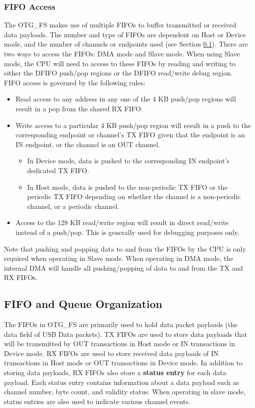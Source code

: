 \documentclass[main\_\_EN.tex]{subfiles}
\begin{document}
\subsubsection{FIFO Access}

The OTG\_FS makes use of multiple FIFOs to buffer transmitted or received data payloads. The number and type of FIFOs are dependent on Host or Device mode, and the number of channels or endpoints used (see Section \ref{FIFO and Queue Organization}). There are two ways to access the FIFOs: DMA mode and Slave mode. When using Slave mode, the CPU will need to access to these FIFOs by reading and writing to either the DFIFO push/pop regions or the DFIFO read/write debug region. FIFO access is governed by the following rules:

\begin{itemize}
    \item Read access to any address in any one of the 4 KB push/pop regions will result in a pop from the shared RX FIFO.
    \item Write access to a particular 4 KB push/pop region will result in a push to the corresponding endpoint or channel’s TX FIFO given that the endpoint is an IN endpoint, or the channel is an OUT channel.
    \begin{itemize}
        \item In Device mode, data is pushed to the corresponding IN endpoint’s dedicated TX FIFO.
        \item In Host mode, data is pushed to the non-periodic TX FIFO or the periodic TX FIFO depending on whether the channel is a non-periodic channel, or a periodic channel.
    \end{itemize}
    \item Access to the 128 KB read/write region will result in direct read/write instead of a push/pop. This is generally used for debugging purposes only.
\end{itemize}

Note that pushing and popping data to and from the FIFOs by the CPU is only required when operating in Slave mode. When operating in DMA mode, the internal DMA will handle all pushing/popping of data to and from the TX and RX FIFOs.

\subsection{FIFO and Queue Organization}\label{FIFO and Queue Organization}
The FIFOs in OTG\_FS are primarily used to hold data packet payloads (the data field of USB Data packets). TX FIFOs are used to store data payloads that will be transmitted by OUT transactions in Host mode or IN transactions in Device mode. RX FIFOs are used to store received data payloads of IN transactions in Host mode or OUT transactions in Device mode. In addition to storing data payloads, RX FIFOs also store a \textbf{status entry} for each data payload. Each status entry contains information about a data payload such as channel number, byte count, and validity status. When operating in slave mode, status entries are also used to indicate various channel events.
\end{document}
